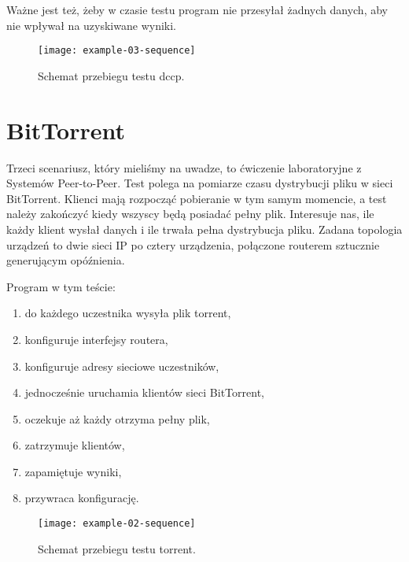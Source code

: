 \documentclass[00-praca-magisterska.tex]{subfiles}
\begin{document}
Ważne jest też, żeby w czasie testu program nie przesyłał żadnych danych, aby
nie wpływał na uzyskiwane wyniki.

\begin{figure}[htb]
\begin{center}
\leavevmode
\texttt{[image: example-03-sequence]}
\end{center}
\caption{Schemat przebiegu testu dccp.}
\label{fig:example-03-sequence}
\end{figure}

\section{BitTorrent}


Trzeci scenariusz, który mieliśmy na uwadze, to ćwiczenie laboratoryjne z
Systemów Peer-to-Peer. Test polega na pomiarze czasu dystrybucji pliku w sieci
BitTorrent. Klienci mają rozpocząć pobieranie w tym samym momencie, a test należy
zakończyć kiedy wszyscy będą posiadać pełny plik. Interesuje nas, ile każdy
klient wysłał danych i ile trwała pełna dystrybucja pliku. Zadana topologia
urządzeń to dwie sieci IP po cztery urządzenia, połączone routerem sztucznie
generującym opóźnienia.

Program w tym teście:
\begin{enumerate}
\item do każdego uczestnika wysyła plik torrent,
\item konfiguruje interfejsy routera,
\item konfiguruje adresy sieciowe uczestników,
\item jednocześnie uruchamia klientów sieci BitTorrent,
\item oczekuje aż każdy otrzyma pełny plik,
\item zatrzymuje klientów,
\item zapamiętuje wyniki,
\item przywraca konfigurację.
\end{enumerate}

\begin{figure}[htb]
\begin{center}
\leavevmode
\texttt{[image: example-02-sequence]}
\end{center}
\caption{Schemat przebiegu testu torrent.}
\label{fig:example-02-sequence}
\end{figure}
\end{document}
